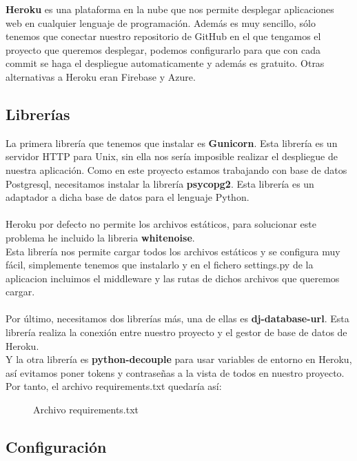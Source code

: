 \textbf{Heroku} es una plataforma en la nube que nos permite desplegar aplicaciones web en cualquier lenguaje de programación.
Además es muy sencillo, sólo tenemos que conectar nuestro repositorio de GitHub en el que tengamos el proyecto que queremos desplegar,
podemos configurarlo para que con cada commit se haga el despliegue automaticamente y además es gratuito. Otras alternativas a Heroku 
eran Firebase y Azure.

\subsection{Librerías}

La primera librería que tenemos que instalar es \textbf{Gunicorn}. Esta librería es un servidor HTTP para Unix, sin ella nos sería imposible realizar el despliegue de nuestra aplicación.
Como en este proyecto estamos trabajando con base de datos Postgresql, necesitamos instalar la librería \textbf{psycopg2}. Esta librería es un adaptador a dicha base de datos para el lenguaje Python.\\\\
Heroku por defecto no permite los archivos estáticos, para solucionar este problema he incluido la libreria \textbf{whitenoise}.\\
Esta librería nos permite cargar todos los archivos estáticos y se configura muy fácil, simplemente tenemos que instalarlo y en
el fichero settings.py de la aplicacion incluimos el middleware y las rutas de dichos archivos que queremos cargar.\\\\
Por último, necesitamos dos librerías más, una de ellas es \textbf{dj-database-url}. Esta librería realiza la conexión entre nuestro proyecto y el gestor de base de datos de Heroku.\\
Y la otra librería es \textbf{python-decouple} para usar variables de entorno en Heroku, así evitamos poner tokens y contraseñas a la vista de todos en nuestro proyecto. \\

Por tanto, el archivo requirements.txt quedaría así:
\begin{figure}[H]
  \centering
  \noindent{}
  \caption{Archivo requirements.txt}
\end{figure}


\subsection{Configuración}


